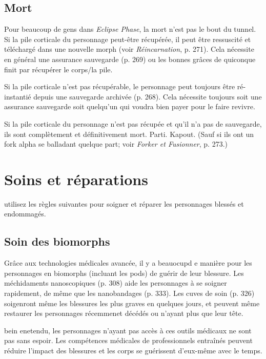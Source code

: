 \subsection{Mort} Pour beaucoup de gens dans \emph{Eclipse Phase}, la mort n'est pas le bout du tunnel. Si la pile corticale du personnage peut-être récupérée, il peut être ressuscité et téléchargé dans une nouvelle morph (voir \emph{Réincarnation}, p. 271). Cela nécessite en général une assurance sauvegarde (p. 269) ou les bonnes grâces de quiconque finit par récupérer le corps/la pile. 

Si la pile corticale n'est pas récupérable, le personnage peut toujours être ré-instantié depuis une sauvegarde archivée (p. 268). Cela nécessite toujours soit une assurance sauvegarde soit quelqu'un qui voudra bien payer pour le faire revivre. 

Si la pile corticale du personnage n'est pas récupée et qu'il n'a pas de sauvegarde, ils sont complètement et définitivement mort. Parti. Kapout. (Sauf si ils ont un fork alpha se balladant quelque part; voir \emph{Forker et Fusionner}, p. 273.) 



\section{Soins et réparations} \label{sec:healing-repair} 

utilisez les règles suivantes pour soigner et réparer les personnages blessés et endommagés. 

\subsection{Soin des biomorphs} 

Grâce aux technologies médicales avancée, il y a beauocupd e manière pour les personnages en biomorphs (incluant les pods) de guérir de leur blessure. Les méchidaments nanoscopiques (p. 308) aide les personnages à se soigner rapidement, de même que les nanobandages (p. 333). Les cuves de soin (p. 326) soigenront même les blessures les plus graves en quelques jours, et peuvent même restaurer les personnages récemmenet décédés ou n'ayant plus que leur tête. 

bein enetendu, les personnages n'ayant pas accès à ces outils médicaux ne sont pas sans espoir. Les compétences médicales de professionnels entraînés peuvent réduire l'impact des blessures et les corps se guérissent d'eux-même avec le temps. 

